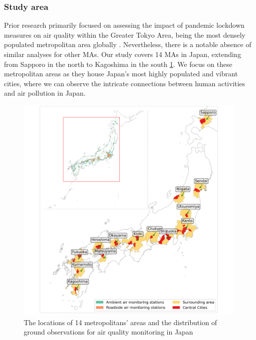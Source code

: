 \subsubsection{Study area}
Prior research primarily focused on assessing the impact of pandemic lockdown measures on air quality within the Greater Tokyo Area, being the most densely populated metropolitan area globally \citep{damiani2022peculiar,zoran2023peculiar}. Nevertheless, there is a notable absence of similar analyses for other MAs. Our study covers 14 MAs in Japan, extending from Sapporo in the north to Kagoshima in the south \ref{fig:chap4_fig2}. We focus on these metropolitan areas as they house Japan's most highly populated and vibrant cities, where we can observe the intricate connections between human activities and air pollution in Japan.\par
\begin{figure}[p]
    \centering
    \includegraphics[width=\textwidth]{figs/chap4/fig2.png}
    \caption[Study area]{The locations of 14 metropolitans’ areas and the distribution of ground observations for air quality monitoring in Japan}
    \label{fig:chap4_fig2}
\end{figure}
